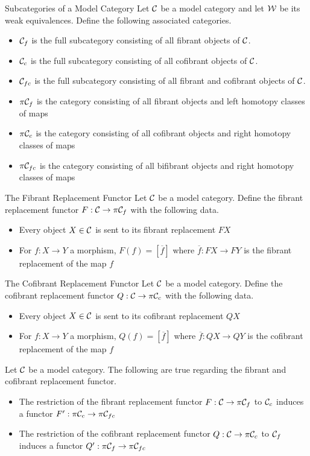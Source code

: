 \documentclass[a4paper]{article}
\begin{document}
\begin{defn}{Subcategories of a Model Category}{} Let $\mathcal{C}$ be a model category and let $\mathcal{W}$ be its weak equivalences. Define the following associated categories. 
\begin{itemize}
\item $\mathcal{C}_f$ is the full subcategory consisting of all fibrant objects of $\mathcal{C}$. 
\item $\mathcal{C}_c$ is the full subcategory consisting of all cofibrant objects of $\mathcal{C}$. 
\item $\mathcal{C}_{fc}$ is the full subcategory consisting of all fibrant and cofibrant objects of $\mathcal{C}$. 
\item $\pi\mathcal{C}_f$ is the category consisting of all fibrant objects and left homotopy classes of maps
\item $\pi\mathcal{C}_c$ is the category consisting of all cofibrant objects and right homotopy classes of maps
\item $\pi\mathcal{C}_{fc}$ is the category consisting of all bifibrant objects and right homotopy classes of maps
\end{itemize}
\end{defn}

\begin{defn}{The Fibrant Replacement Functor}{} Let $\mathcal{C}$ be a model category. Define the fibrant replacement functor $F:\mathcal{C}\to\pi\mathcal{C}_f$ with the following data. 
\begin{itemize}
\item Every object $X\in\mathcal{C}$ is sent to its fibrant replacement $FX$
\item For $f:X\to Y$ a morphism, $F(f)=[\overline{f}]$ where $\overline{f}:FX\to FY$ is the fibrant replacement of the map $f$
\end{itemize}
\end{defn}

\begin{defn}{The Cofibrant Replacement Functor}{} Let $\mathcal{C}$ be a model category. Define the cofibrant replacement functor $Q:\mathcal{C}\to\pi\mathcal{C}_c$ with the following data. 
\begin{itemize}
\item Every object $X\in\mathcal{C}$ is sent to its cofibrant replacement $QX$
\item For $f:X\to Y$ a morphism, $Q(f)=[\overline{f}]$ where $\overline{f}:QX\to QY$ is the cofibrant replacement of the map $f$
\end{itemize}
\end{defn}

\begin{lmm}{}{} Let $\mathcal{C}$ be a model category. The following are true regarding the fibrant and cofibrant replacement functor. 
\begin{itemize}
\item The restriction of the fibrant replacement functor $F:\mathcal{C}\to\pi\mathcal{C}_f$ to $\mathcal{C}_c$ induces a functor $F':\pi\mathcal{C}_c\to\pi\mathcal{C}_{fc}$
\item The restriction of the cofibrant replacement functor $Q:\mathcal{C}\to\pi\mathcal{C}_c$ to $\mathcal{C}_f$ induces a functor $Q':\pi\mathcal{C}_f\to\pi\mathcal{C}_{fc}$
\end{itemize}
\end{lmm}
\end{document}
